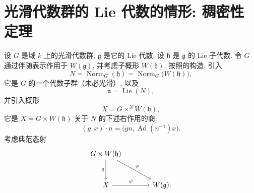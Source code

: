 

\section{光滑代数群的 Lie 代数的情形: 稠密性定理}

设 \(G\) 是域 \(k\) 上的光滑代数群, \(\mathfrak g\) 是它的 Lie 代数. 设 \(\mathfrak h\) 是 \(\mathfrak g\) 的 Lie 子代数. 令 \(G\) 通过伴随表示作用于 \(W(\mathfrak g)\), 并考虑子概形 \(W(\mathfrak h)\). 按照的构造, 引入
\[
  N=\operatorname{Norm}_G(\mathfrak h)
   =\operatorname{Norm}_G\bigl(W(\mathfrak h)\bigr),
\]
它是 \(G\) 的一个代数子群（未必光滑）, 以及
\[
  \mathfrak n=\operatorname{Lie}(N),
\]
并引入概形
\[
  X=G\times^N W(\mathfrak h),
\]
它是 \(\widetilde X=G\times W(\mathfrak h)\) 关于 \(N\) 的下述右作用的商:
\[
  (g,x)\cdot n=\bigl(gn,\operatorname{Ad}(n^{-1})x\bigr).
\]
考虑典范态射
\[
\begin{tikzcd}[column sep=large,row sep=large]
G\times W(\mathfrak h)
  \arrow[d,"q"']
  \arrow[dr,"\varphi"] & \\
X \arrow[r,"\psi"] & W(\mathfrak g).
\end{tikzcd}
\]

